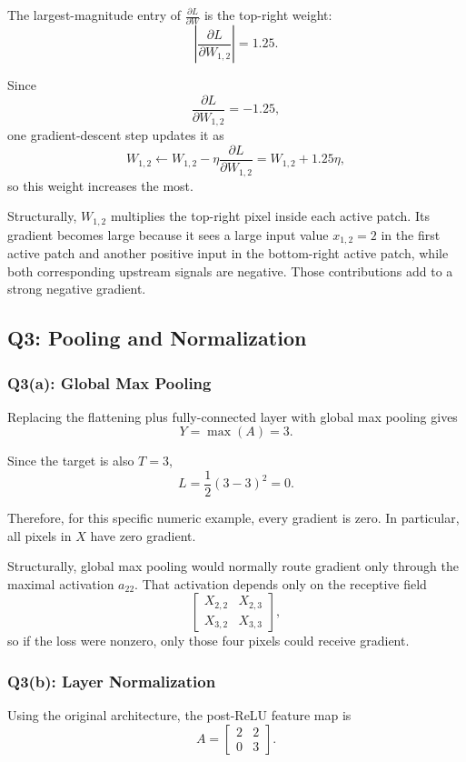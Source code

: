 \documentclass[11pt]{article}
\begin{document}
The largest-magnitude entry of \(\frac{\partial L}{\partial W}\) is the top-right weight:
\[
\left|\frac{\partial L}{\partial W_{1,2}}\right|=1.25.
\]

Since
\[
\frac{\partial L}{\partial W_{1,2}}=-1.25,
\]
one gradient-descent step updates it as
\[
W_{1,2}\leftarrow W_{1,2}-\eta\frac{\partial L}{\partial W_{1,2}}
=W_{1,2}+1.25\eta,
\]
so this weight increases the most.

Structurally, \(W_{1,2}\) multiplies the top-right pixel inside each active patch. Its gradient becomes large because it sees a large input value \(x_{1,2}=2\) in the first active patch and another positive input in the bottom-right active patch, while both corresponding upstream signals are negative. Those contributions add to a strong negative gradient.

\subsection{Q3: Pooling and Normalization}

\subsubsection*{Q3(a): Global Max Pooling}

Replacing the flattening plus fully-connected layer with global max pooling gives
\[
Y=\max(A)=3.
\]

Since the target is also \(T=3\),
\[
L=\frac{1}{2}(3-3)^2=0.
\]

Therefore, for this specific numeric example, every gradient is zero. In particular, all pixels in \(X\) have zero gradient.

Structurally, global max pooling would normally route gradient only through the maximal activation \(a_{22}\). That activation depends only on the receptive field
\[
\begin{bmatrix}
X_{2,2} & X_{2,3}\\
X_{3,2} & X_{3,3}
\end{bmatrix},
\]
so if the loss were nonzero, only those four pixels could receive gradient.

\subsubsection*{Q3(b): Layer Normalization}

Using the original architecture, the post-ReLU feature map is
\[
A=
\begin{bmatrix}
2 & 2\\
0 & 3
\end{bmatrix}.
\]
\end{document}
